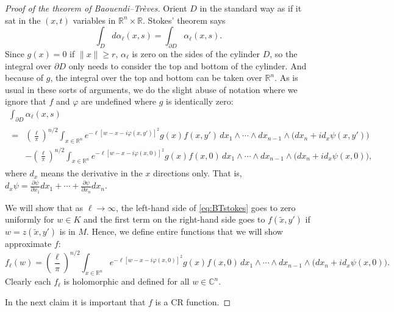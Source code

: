 \documentclass[12pt,openany]{book}
\newcommand{\snorm}[1]{\lVert {#1} \rVert}
\newcommand{\C}{{\mathbb{C}}}
\newcommand{\R}{{\mathbb{R}}}
\theoremstyle{plain}
\theoremstyle{remark}
\theoremstyle{definition}
\theoremstyle{exercise}
\theoremstyle{example}
\begin{document}
\begin{proof}[Proof of the theorem of Baouendi--Tr{\`e}ves]
Orient $D$ in
the standard way as if it sat in the $(x,t)$ variables in $\R^n \times \R$.
Stokes' theorem says
\begin{equation*}
\int_D d \alpha_{\ell} (x,s)
=
\int_{\partial D} \alpha_{\ell} (x,s) .
\end{equation*}
Since $g(x) = 0$ if $\snorm{x} \geq r$, $\alpha_\ell$ is zero on the sides
of the cylinder $D$, so the integral over $\partial D$ only needs to 
consider the top and bottom of the cylinder.  And because of $g$, the integral over the top and bottom
can be taken over $\R^n$.
As is usual in these sorts of arguments, we do the slight abuse of notation
where
we ignore that $f$ and $\varphi$ are undefined
where $g$ is identically zero:
\begin{multline} \label{eq:BTstokes}
\int_{\partial D} \alpha_{\ell}(x,s)
\\
\begin{aligned}
=
&
{\left(\frac{\ell}{\pi}\right)}^{n/2}
\int_{x \in \R^n}
\!\!\!
e^{-\ell [w - x-i\varphi(x,y')]^2 } g(x) f(x,y')
\,
dx_1  \wedge
\cdots \wedge
dx_{n-1}
\wedge
\bigl(dx_{n} + i d_x \psi (x,y') \bigr) 
\\
& 
-
{\left(\frac{\ell}{\pi}\right)}^{n/2}
\int_{x \in \R^n}
\!\!\!
e^{  -\ell [w - x-i\varphi(x,0)]^2 } g(x) f(x,0)
\,
dx_1  \wedge
\cdots \wedge
dx_{n-1}
\wedge
\bigl(dx_{n} + i d_x \psi (x,0) \bigr) ,
\end{aligned}
\end{multline}
where $d_x$ means the derivative in the $x$ directions only.
That is, $d_x \psi =
\frac{\partial \psi}{\partial x_1} dx_1
+ \cdots +
\frac{\partial \psi}{\partial x_n} dx_n$.


We will show that as $\ell \to \infty$, the left-hand side of \eqref{eq:BTstokes}
goes to zero uniformly for $w \in K$
and the first term on the right-hand side goes to $f(\tilde{x},y')$
if $w = z(\tilde{x},y')$ is in $M$.  Hence,
we define entire functions that we will show approximate $f$:
\begin{equation*}
f_\ell(w)
=
{\left(\frac{\ell}{\pi}\right)}^{n/2}
\int_{x \in \R^n}
e^{  -\ell [w - x-i\varphi(x,0)]^2 } g(x) f(x,0)
\,
dx_1  \wedge
\cdots \wedge
dx_{n-1}
\wedge
\bigl(dx_{n} + i d_x \psi (x,0) \bigr) .
\end{equation*}
Clearly each $f_\ell$ is holomorphic and defined for all $w \in \C^n$.

In the next claim it is important that $f$ is a CR function.


\end{proof}
\end{document}
